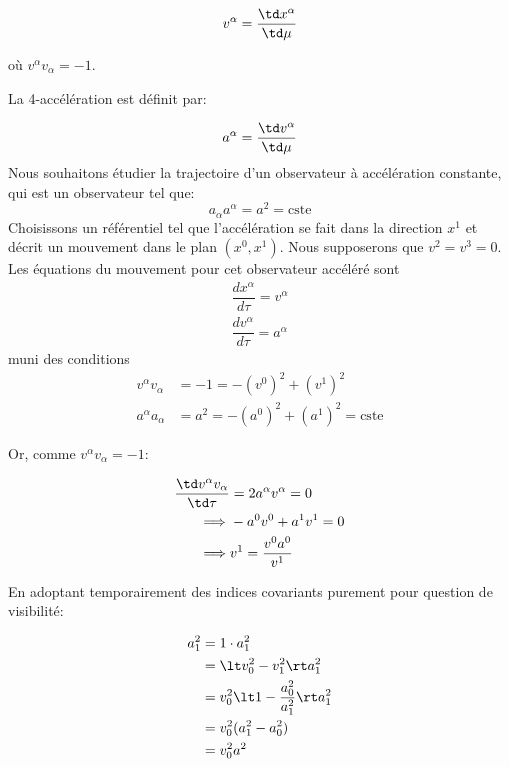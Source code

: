 \begin{exmp}
    \begin{equation*}
        v^{\alpha} = \frac{\td x^{\alpha}}{\td \mu}
    \end{equation*}

    où $v^{\alpha} v_{\alpha} = -1$.

    La 4-accélération est définit par: 

     \begin{equation*}
        a^{\alpha} = \frac{\td v^{\alpha}}{\td \mu}
    \end{equation*}
    Nous souhaitons étudier la trajectoire d'un observateur à accélération constante, qui est un observateur tel que: 
    \begin{equation*}
        a_{\alpha}a^{\alpha} = a^{2} = \text{cste}
    \end{equation*}
    Choisissons un référentiel tel que l'accélération se fait dans la direction $x^{1}$ et décrit un mouvement dans le plan $(x^{0}, x^{1})$. Nous supposerons que $v^2 = v^3 = 0$. Les équations du mouvement pour cet observateur accéléré sont
\begin{align}
  \dfrac{d x^{\alpha}}{d \tau} = v ^{\alpha}\\
 \dfrac{d v^{\alpha}}{d \tau} = a^{\alpha}
\end{align}
muni des conditions
\begin{align}
    v^{\alpha}v_{\alpha} & = -1 = -(v^{0})^2 + (v^{1})^2\\
    a^{\alpha}a_{\alpha} & = a^2 = -(a^{0})^2 + (a^{1})^2 = \mathrm{cste}
\end{align}

Or, comme $v^{\alpha}v_{\alpha} = -1$:

\begin{align}
    \frac{\td v^\alpha v_\alpha}{\td \tau} &= 2 a^{\alpha}v^{\alpha} = 0 \\
    \implies &-a^{0}v^{0} + a^{1}v^{1} = 0\\
    \label{eq:2.57}
    \implies &v^{1} = \frac{v^{0}a^{0}}{v^{1}}
\end{align}

En adoptant temporairement des indices covariants purement pour question de visibilité:

\begin{align}
    a_1^2 &= 1 \cdot a_1^2\\
    &= \lt v_0^2 - v_{1}^2 \rt a_{1}^2\\
    &= v_{0}^2 \lt 1 - \frac{a_0^2}{a_1^2} \rt a_1^2\\
    &= v_{0}^2(a_{1}^2 - a_{0}^2)\\
    &= v_{0}^2 a^2
\end{align}


\end{exmp}
